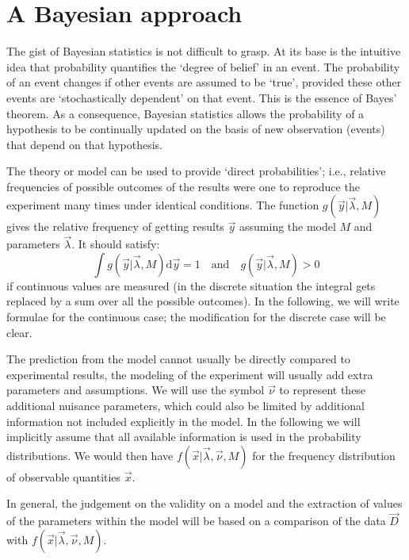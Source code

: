 \chapter{A Bayesian approach}
The gist of Bayesian statistics is not difficult to grasp. At its base is the intuitive idea that probability quantifies the `degree of belief' in an event. The probability of an event changes if other events are assumed to be `true', provided these other events are `stochastically dependent' on that event. This is the essence of Bayes' theorem. As a consequence, Bayesian statistics allows the probability of a hypothesis to be continually updated on the basis of new observation (events) that depend on that hypothesis. 

 The theory or model can be used to provide `direct probabilities'; i.e., relative frequencies of possible outcomes of the results were one to reproduce the experiment many times under identical conditions. The function $g(\vec{y}|\vec{\lambda},M)$ gives the relative frequency of getting results $\vec{y}$ assuming the model $M$ and parameters $\vec{\lambda}$. It should satisfy:
\[\int g(\vec{y}|\vec{\lambda},M)\text{d}\vec{y}=1 \quad\text{and}\quad g(\vec{y}|\vec{\lambda},M)>0\]
if continuous values are measured (in the discrete situation the integral gets replaced by a sum over all the possible outcomes). In the following, we will write formulae for the continuous case; the modification for the discrete case will be clear.

The prediction from the model cannot usually be directly compared to experimental results, the modeling of the experiment will usually add extra parameters and assumptions. We will use the symbol $\vec{\nu}$ to represent these additional nuisance parameters, which could also be limited by additional information not included explicitly in the model. In the following we will implicitly assume that all available information is used in the probability distributions. We would then have $f(\vec{x}|\vec{\lambda},\vec{\nu},M)$ for the frequency distribution of observable quantities $\vec{x}$.

In general, the judgement on the validity on a model and the extraction of values of the parameters within the model will be based on a comparison of the data $\vec{D}$ with $f(\vec{x}|\vec{\lambda},\vec{\nu},M)$.

